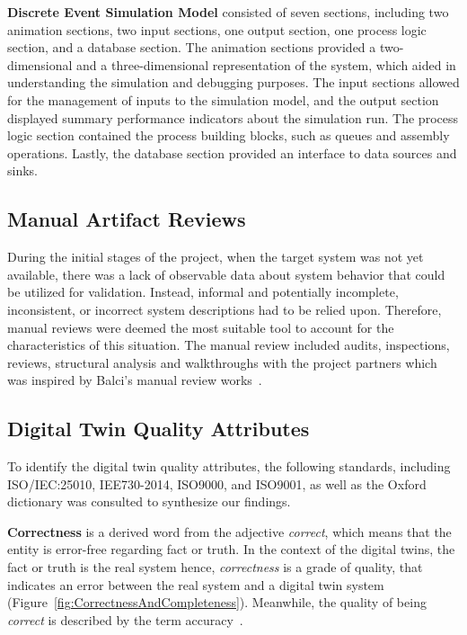 \documentclass{llncs}
\begin{document}
    \textbf{Discrete Event Simulation Model} consisted of seven sections, including two animation sections, two input sections, one output section, one process logic section, and a database section. 
    The animation sections provided a two-dimensional and a three-dimensional representation of the system, 
    which aided in understanding the simulation and debugging purposes. The input sections allowed for the management of inputs to the simulation model, and the output section displayed summary performance indicators about the simulation run. 
    The process logic section contained the process building blocks, such as queues and assembly operations. Lastly, the database section provided an interface to data sources and sinks.
    
    \subsection{Manual Artifact Reviews}
    During the initial stages of the project, when the target system was not yet available,
    there was a lack of observable data about system behavior that could be utilized for validation. 
    Instead, informal and potentially incomplete, inconsistent, or incorrect system descriptions had to be relied upon. 
    Therefore, manual reviews were deemed the most suitable tool to account for the characteristics of this situation.
    The manual review included audits, inspections, reviews, structural analysis and walkthroughs 
    with the project partners which was inspired by Balci's manual review works~\cite{balcitechniques}. 
    
    \subsection{Digital Twin Quality Attributes}\label{section:Digital Twin Quality Attributes}
    To identify the digital twin quality attributes, the following standards, including ISO/IEC:25010, IEE730-2014, ISO9000, and ISO9001, 
    as well as the Oxford dictionary was consulted to 
    synthesize our findings\cite{ISO9000,ISO90012015,ISO/IEC:25010,IEE7302014,OxfordDictionary}.

    \textbf{Correctness} is a  derived word from the adjective \textit{correct}, which means that the entity is error-free regarding fact or truth. 
    In the context of the digital twins, the fact or truth is the real system hence, \textit{correctness} is a grade of quality, 
    that indicates an error between the real system and a digital twin system (Figure~\ref{fig:CorrectnessAndCompleteness}).
    Meanwhile, the quality of being \textit{correct} is described by the term accuracy~\cite{OxfordDictionary}. 
\end{document}
